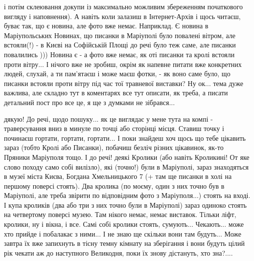 і потім склеювання докупи із максимально можливим збереженням початкового
вигляду і наповнення). А навіть коли залазиш в Інтернет-Архів і щось читаєш,
буває так, що є новина, але фото вже немає.  Наприклад. Є новина в
Маріупольських Новинах, що писанки в Маріуполі було повалені вітром, але
встояли(!) - в Києві на Софійській Площі до речі було теж саме, але писанки
повалились ))) Новина є - а фото вже немає, як оті писанки та кролі встояли
проти вітру... І нічого вже не зробиш, окрім як напевне питати вже конкретних людей,
слухай, а ти пам'ятаєш і може маєш фотки, - як воно саме було, що писанки
встояли проти вітру під час тої травневої виставки?  Ну ок...  тема дуже
важлива, але складно тут в коментарях все тут описати, як треба, а писати
детальний пост про все це, я ще з думками не зібрався...


дякую! До речі, щодо пошуку... як це виглядає у мене тута на компі -
траверсування вниз в минуле по точці або сторінці місця. Ставиш точку і
починаєш гортати, гортати, гортати... І поки знайдеш хоч щось що тебе цікавить
зараз (тобто Кролі або Писанки), побачиш безліч різних цікавинок, як-то
Пряники Маріуполя тощо. І до речі! деякі Кролики (або навіть Кроликині! От яке
слово походу само собі вилізло), які (точно!) були в Маріуполі, зараз
знаходяться в музеї міста Києва, Богдана Хмельницького 7 (+ там ще писанки в
холі на першому поверсі стоять). Два кролика (по моєму, один з них точно був в
Маріуполі, але треба звірити по відповідним фото з Маріуполя...) стоять на
вході. І купа кроликів (два або три з них точно були в Маріуполі) зараз
одиноко стоять на четвертому поверсі музею. Там нікого немає, немає виставок.
Тільки ліфт, кролики, ну і вікна, і все. Самі собі кролики стоять, сумують...
Чекають... може хто прийде і побалакає з ними... І не знаю ще скільки вони там
будуть... Може завтра їх вже запихнуть в тісну темну кімнату на зберігання і
вони будуть цілий рік чекати аж до наступного Великодня, поки їх знову
дістануть, хто зна?....

